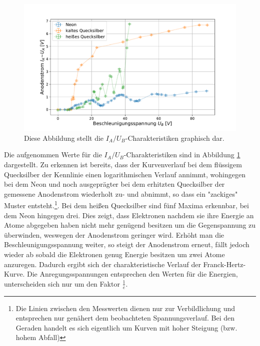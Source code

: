 	\begin{figure}[ht]
		\centering
		\includegraphics[width=\textwidth]{data/CharakteristikZusammen.pdf}
		\caption{Diese Abbildung stellt die $I_A/U_B$-Charakteristiken graphisch dar.}
		\label{fig:Kurve}	
	\end{figure}
	Die aufgenommen Werte für die $I_A/U_B$-Charakteristiken sind in Abbildung \ref{fig:Kurve} dargestellt. 
	Zu erkennen ist bereits, dass der Kurvenverlauf bei dem flüssigem Quecksilber der Kennlinie einen logarithmischen Verlauf annimmt, wohingegen bei dem Neon und noch ausgeprägter bei dem erhitzten Quecksilber der gemessene Anodenstrom wiederholt zu- und abnimmt, so dass ein "zackiges" Muster entsteht.\footnote{Die Linien zwischen den Messwerten dienen nur zur Verbildlichung und entsprechen nur genähert dem beobachteten Spannungsverlauf. Bei den Geraden handelt es sich eigentlich um  Kurven mit hoher Steigung (bzw. hohem Abfall)}. 
	Bei dem heißen Quecksilber sind fünf Maxima erkennbar, bei dem Neon hingegen drei.
	Dies zeigt, dass Elektronen nachdem sie ihre Energie an Atome abgegeben haben nicht mehr genügend besitzen um die Gegenspannung zu überwinden, weswegen der Anodenstrom geringer wird.
	Erhöht man die Beschleunigungsspannung weiter, so steigt der Anodenstrom erneut, fällt jedoch wieder ab sobald die Elektronen genug Energie besitzen um zwei Atome anzuregen.
	Dadurch ergibt sich der charakteristische Verlauf der Franck-Hertz-Kurve.
	Die Anregungsspannungen entsprechen den Werten für die Energien, unterscheiden sich nur um den Faktor $\frac{1}{e}$.
	 
